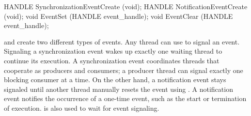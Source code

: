 \begin{paldef}
HANDLE SynchronizationEventCreate (void);
HANDLE NotificationEventCreate    (void);
void   EventSet   (HANDLE event_handle);
void   EventClear (HANDLE event_handle);
\end{paldef}






 and  create two different types of events.
Any thread can use  to signal an event.
Signaling a synchronization event wakes up exactly one waiting thread to continue its execution.
A synchronization event coordinates threads that cooperate as producers and consumers;
a producer thread can signal exactly one blocking consumer at a time.
On the other hand, a notification event stays signaled until another thread
manually resets the event using .
A notification event notifies the occurrence of a one-time event,
such as the start or termination of execution.
is also used
to wait for event signaling.



